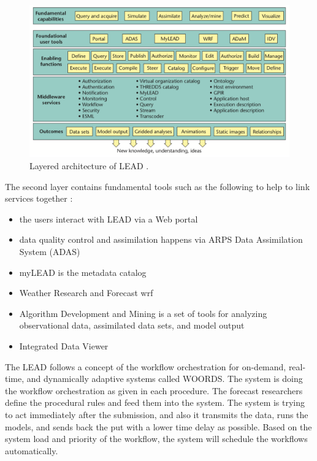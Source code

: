 \begin{figure}[htp]
    \centering
    \includegraphics[width=1.0\textwidth]{lit/lead/LEAD-system-Fundamental-capabilities-familiar-to-meteorologists-are-shown-in-the-top_W640.png}
    \caption[Layered architecture of LEAD]{Layered architecture of LEAD \cite{Droegemeier2005Service-OrientedWeather}.}
    \label{fi:lead_system}
\end{figure}

The second layer contains fundamental tools such as the following to help to link services together \cite{Droegemeier2005Service-OrientedWeather}:
\begin{itemize}
    \item the users interact with LEAD via a Web portal
    \item data quality control and assimilation happens via ARPS Data Assimilation System (ADAS)
    \item myLEAD is the metadata catalog
    \item Weather Research and Forecast \acrfull{wrf} \cite{MesoscaleMicroscaleMeteorologyLaboratoryWeatherModel}
    \item Algorithm Development and Mining is a set of tools for analyzing observational data, assimilated data sets, and model output
    \item Integrated Data Viewer 
\end{itemize}

The LEAD follows a concept of the workflow orchestration for on-demand, real-time, and dynamically adaptive systems called WOORDS. The system is doing the workflow orchestration as given in each procedure. The forecast researchers define the procedural rules and feed them into the system. The system is trying to act immediately after the submission, and also it transmits the data, runs the models, and sends back the put with a lower time delay as possible. Based on the system load and priority of the workflow, the system will schedule the workflows automatically.

